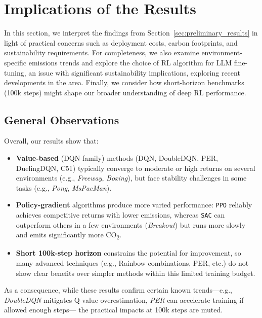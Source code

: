 \section{Implications of the Results}
\label{sec:implications_results}
In this section, we interpret the findings from Section~\ref{sec:preliminary_results} in light of practical concerns such as deployment costs, carbon footprints, and sustainability requirements. For completeness, we also examine environment-specific emissions trends and explore the choice of RL algorithm for LLM fine-tuning, an issue with significant sustainability implications, exploring recent developments in the area. Finally, we consider how short-horizon benchmarks (100k steps) might shape our broader understanding of deep RL performance.

\subsection{General Observations}
\label{subsec:general_observations}
Overall, our results show that:
\begin{itemize}
	\item \textbf{Value-based} (DQN-family) methods (DQN, DoubleDQN, PER, DuelingDQN, 
	C51) typically converge to moderate or high returns on several environments 
	(e.g., \emph{Freeway}, \emph{Boxing}), 
	but face stability challenges in some tasks (e.g., \emph{Pong}, \emph{MsPacMan}). 
	\item \textbf{Policy-gradient} algorithms produce more varied performance: 
	\texttt{PPO} reliably achieves competitive returns with lower emissions, 
	whereas \texttt{SAC} can outperform others in a few environments (\emph{Breakout}) 
	but runs more slowly and emits significantly more CO\textsubscript{2}.
	\item \textbf{Short 100k-step horizon} constrains the potential for improvement, 
	so many advanced techniques (e.g., Rainbow combinations, PER, etc.) 
	do not show clear benefits over simpler methods within this limited training budget.
\end{itemize}

As a consequence, while these results confirm certain known trends—e.g., \emph{DoubleDQN} 
mitigates Q-value overestimation, \emph{PER} can accelerate training if allowed enough steps—
the practical impacts at 100k steps are muted.

